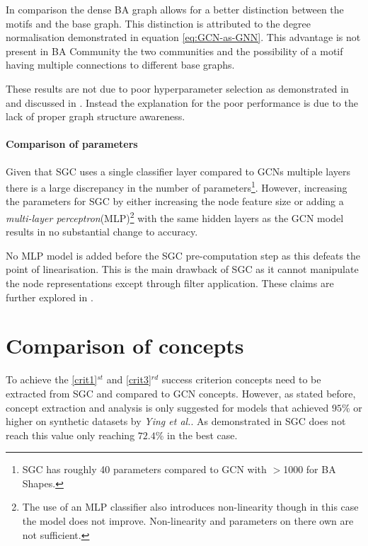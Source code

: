 In comparison the dense BA graph allows for a better distinction between the motifs and the base graph.
This distinction is attributed to the degree normalisation demonstrated in equation \ref{eq:GCN-as-GNN}.
This advantage is not present in BA Community the two communities and the possibility of a motif having multiple connections to different base graphs.

These results are not due to poor hyperparameter selection as demonstrated in  and discussed in .
Instead the explanation for the poor performance is due to the lack of proper graph structure awareness.

\paragraph{Comparison of parameters}
Given that SGC uses a single classifier layer compared to GCNs multiple layers there is a large discrepancy in the number of parameters\footnote{SGC has roughly 40 parameters compared to GCN with $>$1000 for BA Shapes.}.
However, increasing the parameters for SGC by either increasing the node feature size or adding a \emph{multi-layer perceptron}(MLP)\footnote{The use of an MLP classifier also introduces non-linearity though in this case the model does not improve. Non-linearity and parameters on there own are not sufficient.} with the same hidden layers as the GCN model results in no substantial change to accuracy.

No MLP model is added before the SGC pre-computation step as this defeats the point of linearisation.
This is the main drawback of SGC as it cannot manipulate the node representations except through filter application.
These claims are further explored in .

\section{Comparison of concepts}
\label{sec:comp-concept}

To achieve the \ref{crit1}$^{st}$ and \ref{crit3}$^{rd}$ success criterion concepts need to be extracted from SGC and compared to GCN concepts.
However, as stated before, concept extraction and analysis is only suggested for models that achieved $95$\% or higher on synthetic datasets by \textit{Ying et al.}\cite{ying2019gnnexplainer}.
As demonstrated in  SGC does not reach this value only reaching $72.4$\% in the best case.

